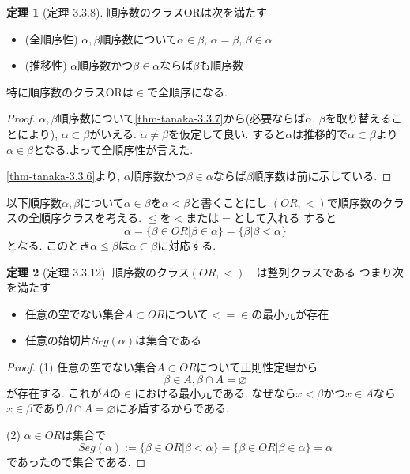 \documentclass[dvipdfmx,a4paper,11pt]{report}
\theoremstyle{definition}
\newtheorem{thm}{定理}
\begin{document}
 \begin{tcolorbox}
 [colback = white, colframe = green!35!black, fonttitle = \bfseries,breakable = true]
\begin{thm}[定理 3.3.8]
順序数のクラスORは次を満たす
\begin{itemize}
\item(全順序性) $\alpha, \beta$順序数について$\alpha \in \beta$, $\alpha = \beta$, $\beta \in \alpha$
\item (推移性) $\alpha$順序数かつ$\beta \in \alpha$ならば$\beta$も順序数
\end{itemize}
特に順序数のクラスORは$\in$で全順序になる. 
\end{thm}
\end{tcolorbox}

\begin{proof}
$\alpha, \beta$順序数について\ref{thm-tanaka-3.3.7}から(必要ならば$\alpha$, $\beta$を取り替えることにより), $\alpha \subset \beta$がいえる. $\alpha \neq \beta$を仮定して良い.
すると$\alpha$は推移的で$\alpha \subset \beta$より$\alpha \in \beta$となる.よって全順序性が言えた.

\ref{thm-tanaka-3.3.6}より,  $\alpha$順序数かつ$\beta \in \alpha$ならば$\beta$順序数は前に示している. 
\end{proof}

以下順序数$\alpha, \beta$について$\alpha \in \beta$を$\alpha < \beta$と書くことにし
$(OR, <)$で順序数のクラスの全順序クラスを考える.
$\le$を$<$または$=$として入れる
すると
$$
\alpha
=
\{\beta \in OR | \beta \in \alpha \}
=
\{ \beta | \beta< \alpha\}
$$
となる.
このとき$\alpha \le \beta$は$\alpha \subset \beta$に対応する. 

 \begin{tcolorbox}
 [colback = white, colframe = green!35!black, fonttitle = \bfseries,breakable = true]
\begin{thm}[定理 3.3.12]
順序数のクラス$(OR, <)$　は整列クラスである
つまり次を満たす
\begin{itemize}
\item 任意の空でない集合$A \subset OR$について$< = \in$の最小元が存在
\item 任意の始切片$Seg(\alpha)$は集合である
\end{itemize}
\end{thm}
\end{tcolorbox}

\begin{proof}
(1) 任意の空でない集合$A \subset OR$について正則性定理から
$$
\beta \in A, \beta \cap A = \varnothing
$$
が存在する. 
これが$A$の$\in$における最小元である. 
なぜなら$x < \beta$かつ$x \in A$なら$x \in \beta$であり$\beta \cap A = \varnothing$に矛盾するからである.

(2) $\alpha \in OR$は集合で
$$Seg(\alpha):= \{ \beta \in OR | \beta < \alpha\}
=
 \{ \beta \in OR | \beta \in  \alpha\}
= \alpha
$$であったので集合である.
\end{proof}
\end{document}
